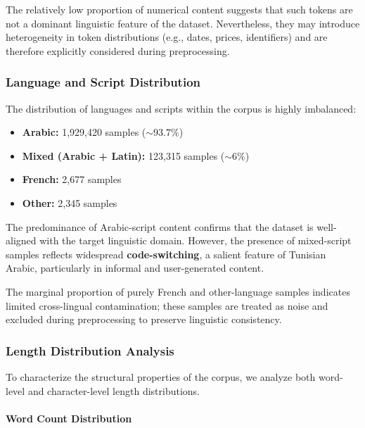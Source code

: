\documentclass[12pt,a4paper]{report}
\begin{document}
The relatively low proportion of numerical content suggests that such tokens are not a dominant linguistic feature of the dataset. Nevertheless, they may introduce heterogeneity in token distributions (e.g., dates, prices, identifiers) and are therefore explicitly considered during preprocessing.


\subsubsection{Language and Script Distribution}

The distribution of languages and scripts within the corpus is highly imbalanced:

\begin{itemize}
    \item \textbf{Arabic:} 1,929,420 samples (\(\sim 93.7\%\))
    \item \textbf{Mixed (Arabic + Latin):} 123,315 samples (\(\sim 6\%\))
    \item \textbf{French:} 2,677 samples
    \item \textbf{Other:} 2,345 samples
\end{itemize}

The predominance of Arabic-script content confirms that the dataset is well-aligned with the target linguistic domain. However, the presence of mixed-script samples reflects widespread \textbf{code-switching}, a salient feature of Tunisian Arabic, particularly in informal and user-generated content.

The marginal proportion of purely French and other-language samples indicates limited cross-lingual contamination; these samples are treated as noise and excluded during preprocessing to preserve linguistic consistency.


\subsubsection{Length Distribution Analysis}

To characterize the structural properties of the corpus, we analyze both word-level and character-level length distributions.

\paragraph{Word Count Distribution}
\end{document}
